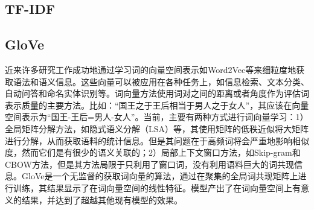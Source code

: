 \subsection{TF-IDF}
\subsection{GloVe}
近来许多研究工作成功地通过学习词的向量空间表示如Word2Vec\cite{mikolov2013distributed}等来细粒度地获取语法和语义信息。这些向量可以被应用在各种任务上，如信息检索、文本分类、自动问答和命名实体识别等。词向量方法使用词对之间的距离或者角度作为评估词表示质量的主要方法。比如：“国王之于王后相当于男人之于女人”，其应该在向量空间表示为“国王-王后=男人-女人”。当前，主要有两种方式进行词向量学习：1）全局矩阵分解方法，如隐式语义分解（LSA）\cite{deerwester1990indexing}等，其使用矩阵的低秩近似将大矩阵进行分解，从而获取语料的统计信息。但是其问题在于高频词将会严重地影响相似度，然而它们是有很少的语义关联的；2）局部上下文窗口方法，如Skip-gram和CBOW方法\cite{mikolov2013distributed}，但是其方法局限于只利用了窗口词，没有利用语料巨大的词共现信息。GloVe是一个无监督的获取词向量的算法，通过在聚集的全局词共现矩阵上进行训练，其结果显示了在词向量空间的线性特征。模型产出了在词向量空间上有意义的结果，并达到了超越其他现有模型的效果。

